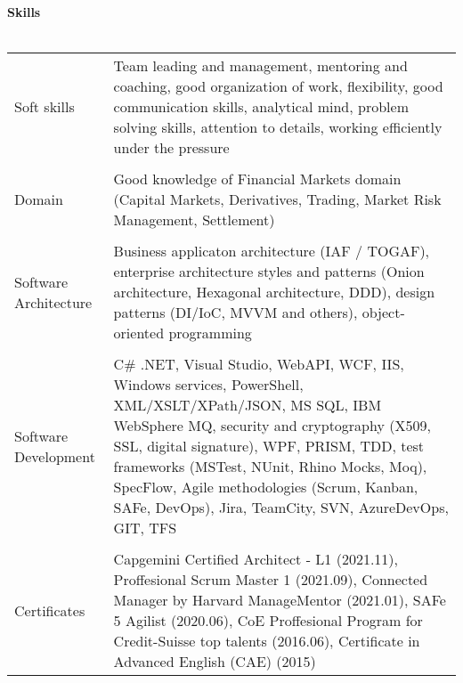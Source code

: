 \textbf{Skills}
\\
\\
\begin{tabular}{p{}|p{}}
Soft skills
& Team leading and management, mentoring and coaching, good organization of work, flexibility, good communication skills, analytical mind, problem solving skills, attention to details, working efficiently under the pressure \\
& \\
Domain
& Good knowledge of Financial Markets domain (Capital Markets, Derivatives, Trading, Market Risk Management, Settlement)\\
& \\
Software Architecture
& Business applicaton architecture (IAF / TOGAF), enterprise architecture styles and patterns (Onion architecture, Hexagonal architecture, DDD), design patterns (DI/IoC, MVVM and others), object-oriented programming \\
& \\
Software Development
& C\# .NET, Visual Studio, WebAPI, WCF, IIS, Windows services, PowerShell, XML/XSLT/XPath/JSON, MS SQL, IBM WebSphere MQ, security and cryptography (X509, SSL, digital signature), WPF, PRISM, TDD, test frameworks (MSTest, NUnit, Rhino Mocks, Moq), SpecFlow, Agile methodologies (Scrum, Kanban, SAFe, DevOps), Jira, TeamCity, SVN, AzureDevOps, GIT, TFS \\
& \\
Certificates
& Capgemini Certified Architect - L1 (2021.11), Proffesional Scrum Master 1 (2021.09), Connected Manager by Harvard ManageMentor (2021.01), SAFe 5 Agilist (2020.06), CoE Proffesional Program for Credit-Suisse top talents (2016.06), Certificate in Advanced English (CAE) (2015) \\
\end{tabular}